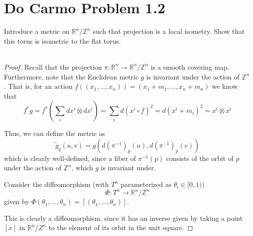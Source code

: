 \documentclass[fontsize=11pt]{scrartcl} %
\numberwithin{equation}{section} %
\numberwithin{figure}{section} %
\numberwithin{table}{section} %
\newcommand{\R}{\mathbb{R}}
\newcommand{\Z}{\mathbb{Z}}
\begin{document}
\section*{Do Carmo Problem 1.2}
Introduce a metric on $\R^n/{\Z^n}$ such that projection is a local isometry.
Show that this torus is isometric to the flat torus.
\\
\\
\begin{proof}
    Recall that the projection $\pi:\R^n\to\R^n/{\Z^n}$ is a smooth covering
    map. Furthermore, note that the Euclidean metric $g$ is invariant under the
    action of $\Z^n$. That is, for an action $f((x_1,\dots,x_n)) =
    (x_1+m_1,\dots,x_n+m_n)$ we know that
    \[
        f^*g = f^*(\sum_idx^i\otimes dx^i) = \sum_id(x^i\circ f)^2
        = d(x^i+m_i)^2 = x^i\otimes x^i
    \]

    Thus, we can define the metric as
    \[
        \tilde{g}_q(u,v) = g(d(\pi^{-1})_p(u),d(\pi^{-1})_p(v))
    \]
    which is clearly well-defined, since a fiber of $\pi^{-1}(p)$ consists of the
    orbit of $p$ under the action of $\Z^n$, which $g$ is invariant under.

    Consider the diffeomorphism (with $T^n$ parameterized as $\theta_i\in
    [0,1)$)
    \[
        \Phi:T^n\to \R^n/{\Z^n}
    \]
    given by $\Phi(\theta_1,\dots,\theta_n) = [(\theta_1,\dots,\theta_n)]$.

    This is clearly a diffeomorphism, since it has an inverse given by taking a
    point $[x]$ in $\R^n/{Z^n}$ to the element of its orbit in the unit square.
\end{proof}
\end{document}

